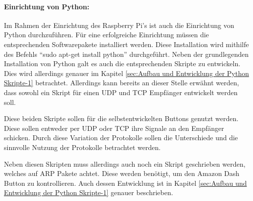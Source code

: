 \paragraph{Einrichtung von Python:}$\;$ \\
\label{sec:Python Skripte-1} 
Im Rahmen der Einrichtung des Raspberry Pi's ist auch die Einrichtung von Python durchzuführen. Für eine erfolgreiche Einrichtung müssen die entsprechenden Softwarepakete installiert werden. Diese Installation wird mithilfe des Befehls ``sudo apt-get install python'' durchgeführt. Neben der grundlegenden Installation von Python galt es auch die entsprechenden Skripte zu entwickeln. Dies wird allerdings genauer im Kapitel \ref{sec:Aufbau und Entwicklung der Python Skripte-1} betrachtet. Allerdings kann bereits an dieser Stelle erwähnt werden, dass sowohl ein Skript für einen \ac{UDP} und \ac{TCP} Empfänger entwickelt werden soll. 

Diese beiden Skripte sollen für die selbstentwickelten Buttons genutzt werden. Diese sollen entweder per \ac{UDP} oder \ac{TCP} ihre Signale an den Empfänger schicken. Durch diese Variation der Protokolle sollen die Unterschiede und die sinnvolle Nutzung der Protokolle betrachtet werden. 

Neben diesen Skripten muss allerdings auch noch ein Skript geschrieben werden, welches auf \ac{ARP} Pakete achtet. Diese werden benötigt, um den Amazon Dash Button zu kontrollieren. Auch dessen Entwicklung ist in Kapitel \ref{sec:Aufbau und Entwicklung der Python Skripte-1} genauer beschrieben. 
